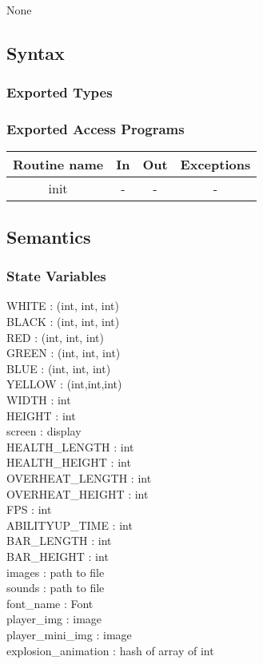 \documentclass[12pt, titlepage]{article}
\begin{document}
None

\subsection {Syntax}

\subsubsection {Exported Types}

\subsubsection {Exported Access Programs}

\begin{tabular}{| c | c | c | c |}
	\hline
	\textbf{Routine name} & \textbf{In} & \textbf{Out} & \textbf{Exceptions}\\
	\hline
	init & - & - & -  \\
	\hline
\end{tabular}

\subsection {Semantics}

\subsubsection {State Variables}
WHITE : (int, int, int)\\
BLACK : (int, int, int)\\
RED : (int, int, int)\\
GREEN : (int, int, int)\\
BLUE : (int, int, int)\\
YELLOW : (int,int,int)\\
WIDTH : int\\
HEIGHT : int\\
screen : display\\
HEALTH\_LENGTH : int\\
HEALTH\_HEIGHT : int\\
OVERHEAT\_LENGTH : int\\
OVERHEAT\_HEIGHT : int\\
FPS : int\\
ABILITYUP\_TIME : int\\
BAR\_LENGTH : int\\
BAR\_HEIGHT : int\\
images : path to file\\
sounds : path to file\\
font\_name : Font\\
player\_img : image\\
player\_mini\_img : image\\
explosion\_animation : hash of array of int
\end{document}
